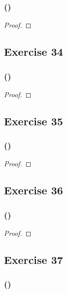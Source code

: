 \documentclass[14pt]{extarticle}
\begin{document}
\subsubsection{()}

\begin{proof}

\end{proof}

\subsection{Exercise 34}

\subsubsection{()}

\begin{proof}

\end{proof}

\subsection{Exercise 35}

\subsubsection{()}

\begin{proof}

\end{proof}

\subsection{Exercise 36}

\subsubsection{()}

\begin{proof}

\end{proof}

\subsection{Exercise 37}

\subsubsection{()}
\end{document}
